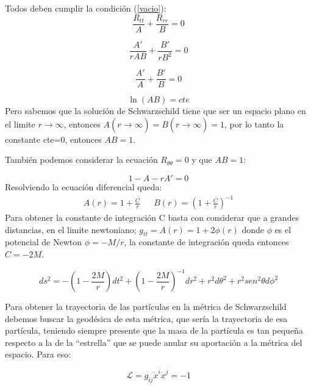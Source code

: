 \documentclass{article}
\begin{document}
Todos deben cumplir la condición (\ref{vacio}):
\begin{equation}
    \frac{R_{tt}}{A}+\frac{R_{rr}}{B}=0
\end{equation}

\begin{equation}
    \frac{A'}{rAB}+\frac{B'}{rB^{2}}=0
\end{equation}

\begin{equation}
    \frac{A'}{A}+\frac{B'}{B}=0
\end{equation}

\begin{equation}
    \ln(AB)=cte
\end{equation}
Pero sabemos que la solución de Schwarzschild tiene que ser un espacio plano en el limite $r \xrightarrow[]{} \infty$, entonces $A(r \xrightarrow[]{} \infty)=B(r \xrightarrow[]{} \infty)=1$, por lo tanto la constante cte=0, entonces $AB=1$.

También podemos considerar la ecuación $R_{\theta \theta}=0$ y que $AB=1$:

\begin{equation}
    1-A-rA'=0
\end{equation}
Resolviendo la ecuación diferencial queda:
\begin{align}
    A(r)=1+\frac{C}{r} && B(r)=\left( 1+\frac{C}{r}\right)^{-1}
\end{align}
Para obtener la constante de integración C basta con considerar que a grandes distancias, en el limite newtoniano; $g_{tt}=A(r)=1+2\phi(r)$\cite{rodriguez2019solucion} donde $\phi$ es el potencial de Newton $\phi=-M/r$, la constante de integración queda entonces $C=-2M$.

\begin{equation}
    ds^{2}=
    -\left(1-\frac{2M}{r}\right)dt^{2} 
    +\left(1-\frac{2M}{r}\right)^{-1}dr^{2} 
    +r^{2}d\theta^{2}+ 
    r^{2}sen^{2}\theta d\phi^{2}
\end{equation}

Para obtener la trayectoria de las partículas en la métrica de Schwarzschild debemos buscar la geodésica de esta métrica, que sería la trayectoria de esa partícula, teniendo siempre presente que la masa de la partícula es tan pequeña respecto a la de la “estrella” que se puede anular su aportación a la métrica del espacio. Para eso:\cite{zamorageodesicas}

\begin{equation}
    \mathcal{L}=g_{ij}\dot x^{i}\dot x^{j}=-1
\end{equation}
\end{document}
